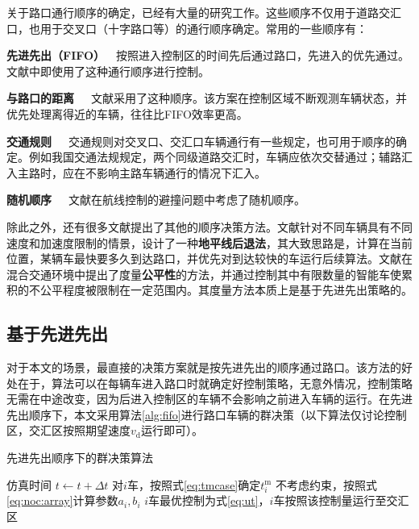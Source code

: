 关于路口通行顺序的确定，已经有大量的研究工作。这些顺序不仅用于道路交汇口，也用于交叉口（十字路口等）的通行顺序确定。常用的一些顺序有：

\textbf{先进先出（FIFO）}\ \ 按照进入控制区的时间先后通过路口，先进入的优先通过。文献中即使用了这种通行顺序进行控制。

\textbf{与路口的距离}\ \ \ 文献采用了这种顺序。该方案在控制区域不断观测车辆状态，并优先处理离得近的车辆，往往比FIFO效率更高。

\textbf{交通规则}\ \ \ 交通规则对交叉口、交汇口车辆通行有一些规定，也可用于顺序的确定。例如我国交通法规规定，两个同级道路交汇时，车辆应依次交替通过；辅路汇入主路时，应在不影响主路车辆通行的情况下汇入。

\textbf{随机顺序}\ \ \ 文献在航线控制的避撞问题中考虑了随机顺序。

除此之外，还有很多文献提出了其他的顺序决策方法。文献针对不同车辆具有不同速度和加速度限制的情景，设计了一种\textbf{地平线后退法}，其大致思路是，计算在当前位置，某辆车最快要多久到达路口，并优先对到达较快的车运行后续算法。文献在混合交通环境中提出了度量\textbf{公平性}的方法，并通过控制其中有限数量的智能车使累积的不公平程度被限制在一定范围内。其度量方法本质上是基于先进先出策略的。

\subsection{基于先进先出}
对于本文的场景，最直接的决策方案就是按先进先出的顺序通过路口。该方法的好处在于，算法可以在每辆车进入路口时就确定好控制策略，无意外情况，控制策略无需在中途改变，因为后进入控制区的车辆不会影响之前进入车辆的运行。在先进先出顺序下，本文采用算法\eqref{alg:fifo}进行路口车辆的群决策（以下算法仅讨论控制区，交汇区按照期望速度$v_\mathrm{d}$运行即可）。

\begin{algorithm}[htbp]
\small
\caption{先进先出顺序下的群决策算法}
\label{alg:fifo}
\begin{algorithmic}
  \Statex
    \State 仿真时间 $t\gets t+\Delta t$
        \State 对$i$车，按照式\eqref{eq:tmcase}确定$t_i^\mathrm{m}$
        \State 不考虑约束，按照式\eqref{eq:noc:array}计算参数$a_i, b_i$
        \State $i$车最优控制为式\eqref{eq:ut}，$i$车按照该控制量运行至交汇区
      \EndFor
    \EndIf
  \EndWhile
\end{algorithmic}
\end{algorithm}

